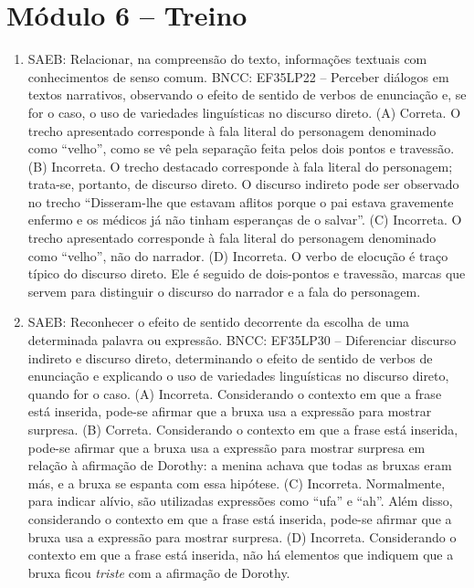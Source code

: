 \section*{Módulo 6 – Treino}

\begin{enumerate}
\item
SAEB: Relacionar, na compreensão do texto, informações textuais com
conhecimentos de senso comum.
BNCC: EF35LP22 -- Perceber diálogos em textos narrativos, observando o
efeito de sentido de verbos de enunciação e, se for o caso, o uso de
variedades linguísticas no discurso direto.
(A) Correta. O trecho apresentado corresponde à fala literal do personagem
denominado como ``velho'', como se vê pela separação feita pelos dois
pontos e travessão.
(B) Incorreta. O trecho destacado corresponde à fala literal do personagem; 
trata-se, portanto, de discurso direto. O discurso indireto
pode ser observado no trecho ``Disseram-lhe que estavam aflitos
porque o pai estava gravemente enfermo e os médicos já não tinham
esperanças de o salvar''.
(C) Incorreta. O trecho apresentado corresponde à fala literal do personagem
denominado como ``velho'', não do narrador.  
(D) Incorreta. O verbo de elocução é traço típico do discurso direto. Ele é
seguido de dois-pontos e travessão, marcas que servem para distinguir o 
discurso do narrador e a fala do personagem.

\item
SAEB: Reconhecer o efeito
de sentido decorrente da escolha de uma determinada palavra ou
expressão.
BNCC: EF35LP30 -- Diferenciar discurso indireto e discurso direto,
determinando o efeito de sentido de verbos de enunciação e explicando o
uso de variedades linguísticas no discurso direto, quando for o caso.
(A) Incorreta. Considerando o contexto em que a frase está inserida, 
pode-se afirmar que a bruxa usa a expressão para mostrar surpresa.
(B) Correta. Considerando o contexto em que a frase está inserida, 
pode-se afirmar que a bruxa usa a expressão para mostrar surpresa em 
relação à afirmação de Dorothy: a menina achava que todas as bruxas eram
más, e a bruxa se espanta com essa hipótese.
(C)  Incorreta. Normalmente, para indicar alívio, são utilizadas
expressões como ``ufa'' e ``ah''. Além disso, considerando o contexto em
que a frase está inserida, pode-se afirmar que a bruxa usa a expressão 
para mostrar surpresa.
(D)  Incorreta. Considerando o contexto em que a frase está inserida, 
não há elementos que indiquem que a bruxa ficou \textit{triste} com a 
afirmação de Dorothy.


\end{enumerate}

